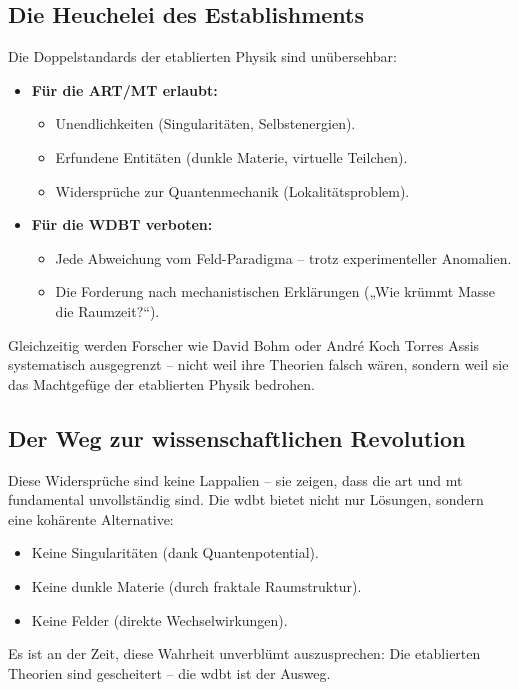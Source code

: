\subsection{Die Heuchelei des Establishments}
Die Doppelstandards der etablierten Physik sind unübersehbar:
\begin{itemize}
    \item \textbf{Für die ART/MT erlaubt:}
    \begin{itemize}
        \item Unendlichkeiten (Singularitäten, Selbstenergien).
        \item Erfundene Entitäten (dunkle Materie, virtuelle Teilchen).
        \item Widersprüche zur Quantenmechanik (Lokalitätsproblem).
    \end{itemize}
    \item \textbf{Für die WDBT verboten:}
    \begin{itemize}
        \item Jede Abweichung vom Feld-Paradigma – trotz experimenteller Anomalien.
        \item Die Forderung nach mechanistischen Erklärungen („Wie krümmt Masse die Raumzeit?“).
    \end{itemize}
\end{itemize}
Gleichzeitig werden Forscher wie David Bohm oder André Koch Torres Assis systematisch ausgegrenzt – nicht weil ihre Theorien falsch wären, sondern weil sie das Machtgefüge der etablierten
Physik bedrohen.

\subsection{Der Weg zur wissenschaftlichen Revolution}
Diese Widersprüche sind keine Lappalien – sie zeigen, dass die \gls{art} und \gls{mt} fundamental unvollständig sind. Die \gls{wdbt} bietet nicht nur Lösungen, sondern eine kohärente Alternative:
\begin{itemize}
    \item Keine Singularitäten (dank Quantenpotential).
    \item Keine dunkle Materie (durch fraktale Raumstruktur).
    \item Keine Felder (direkte Wechselwirkungen).
\end{itemize}
Es ist an der Zeit, diese Wahrheit unverblümt auszusprechen: Die etablierten Theorien sind gescheitert – die \gls{wdbt} ist der Ausweg.
